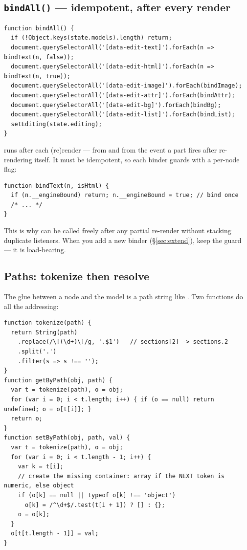 \documentclass[11pt]{article}
\begin{document}
\subsection{\texttt{bindAll()} --- idempotent, after every render}

\begin{lstlisting}
function bindAll() {
  if (!Object.keys(state.models).length) return;
  document.querySelectorAll('[data-edit-text]').forEach(n => bindText(n, false));
  document.querySelectorAll('[data-edit-html]').forEach(n => bindText(n, true));
  document.querySelectorAll('[data-edit-image]').forEach(bindImage);
  document.querySelectorAll('[data-edit-attr]').forEach(bindAttr);
  document.querySelectorAll('[data-edit-bg]').forEach(bindBg);
  document.querySelectorAll('[data-edit-list]').forEach(bindList);
  setEditing(state.editing);
}
\end{lstlisting}

 runs after each (re)render --- from  and from the
 event a part fires after re-rendering itself. It must be
idempotent, so each binder guards with a per-node flag:

\begin{lstlisting}
function bindText(n, isHtml) {
  if (n.__engineBound) return; n.__engineBound = true; // bind once
  /* ... */
}
\end{lstlisting}

This is why  can be called freely after any partial re-render
without stacking duplicate listeners. When you add a new binder (\S\ref{sec:extend}),
keep the  guard --- it is load-bearing.

\subsection{Paths: tokenize then resolve}

The glue between a node and the model is a path string like
. Two functions do all the addressing:

\begin{lstlisting}
function tokenize(path) {
  return String(path)
    .replace(/\[(\d+)\]/g, '.$1')   // sections[2] -> sections.2
    .split('.')
    .filter(s => s !== '');
}
function getByPath(obj, path) {
  var t = tokenize(path), o = obj;
  for (var i = 0; i < t.length; i++) { if (o == null) return undefined; o = o[t[i]]; }
  return o;
}
function setByPath(obj, path, val) {
  var t = tokenize(path), o = obj;
  for (var i = 0; i < t.length - 1; i++) {
    var k = t[i];
    // create the missing container: array if the NEXT token is numeric, else object
    if (o[k] == null || typeof o[k] !== 'object')
      o[k] = /^\d+$/.test(t[i + 1]) ? [] : {};
    o = o[k];
  }
  o[t[t.length - 1]] = val;
}
\end{lstlisting}
\end{document}
